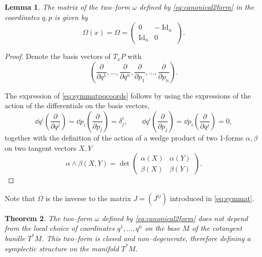 \documentclass[english,fontsize=11pt,paper=b5]{scrbook}
\DeclareMathOperator{\Id}{Id}
\DeclareMathOperator{\Id}{Id}
\newtheorem{theorem}{Theorem}[chapter]
\newtheorem{lemma}[theorem]{Lemma}
\theoremstyle{definition}
\begin{document}
    \begin{lemma}
      The matrix of the two--form $\omega$ defined by \eqref{eq:canonical2form} in the coordinates $q,p$ is given by
      \begin{equation}\label{eq:symmatpqcoords}
        \Omega(x) = \Omega = \begin{pmatrix}
          0     & -\Id_n \\
          \Id_n & 0
        \end{pmatrix}.
      \end{equation}
    \end{lemma}
    \begin{proof}
      Denote the basis vectors of $T_x P$ with
      \begin{equation}
        \left(
          \frac{\partial}{\partial q^1}, \ldots, \frac{\partial}{\partial q^n},
          \frac{\partial}{\partial p_1}, \ldots, \frac{\partial}{\partial p_n}
        \right).
      \end{equation}

      The expression of \eqref{eq:symmatpqcoords} follows by using the expressions of the action of the differentials on the basis vectors,
      \begin{equation}
        \dd q^i\left(\frac{\partial}{\partial q^j}\right) = \dd p_i\left(\frac{\partial}{\partial p_j}\right) =\delta^i_j, \qquad
        \dd q^i\left(\frac{\partial}{\partial p_j}\right) =
        \dd p_i\left(\frac{\partial}{\partial q^j}\right) = 0,
      \end{equation}
      together with the definition of the action of a wedge product of two 1-forms $\alpha, \beta$ on two tangent vectors $X, Y$
      \begin{equation}
        \alpha \wedge \beta (X, Y) = \det\begin{pmatrix}
          \alpha(X) & \alpha(Y) \\
          \beta(X)  & \beta(Y)
        \end{pmatrix}.
      \end{equation}
    \end{proof}

    Note that $\Omega$ is the inverse to the matrix $J = (J^{ij})$ introduced in \eqref{eq:symmat}.

    \begin{theorem}\label{thm:propc2f}
      The two--form $\omega$ defined by \eqref{eq:canonical2form} does not depend from the local choice of coordinates $q^1, \ldots, q^n$ on the base $M$ of the cotangent bundle $T^* M$. This two--form is closed and non--degenerate, therefore defining a symplectic structure on the manifold $T^*M$.
    \end{theorem}
\end{document}
